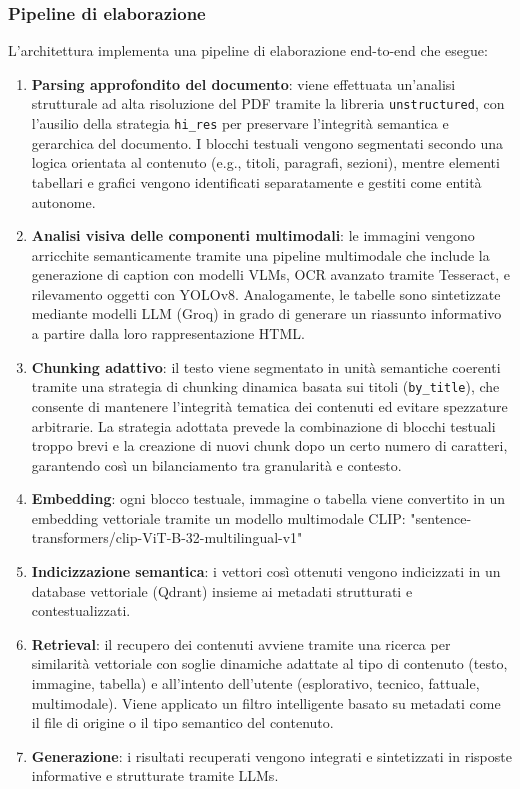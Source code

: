 \documentclass[12pt,a4paper]{article}
\begin{document}
\subsubsection{Pipeline di elaborazione}
L'architettura implementa una pipeline di elaborazione end-to-end che esegue:

\begin{enumerate}
    \item \textbf{Parsing approfondito del documento}: viene effettuata un'analisi strutturale ad alta risoluzione del PDF tramite la libreria \verb|unstructured|, con l'ausilio della strategia \verb|hi_res| per preservare l'integrità semantica e gerarchica del documento. I blocchi testuali vengono segmentati secondo una logica orientata al contenuto (e.g., titoli, paragrafi, sezioni), mentre elementi tabellari e grafici vengono identificati separatamente e gestiti come entità autonome.
    
    \item \textbf{Analisi visiva delle componenti multimodali}: le immagini vengono arricchite semanticamente tramite una pipeline multimodale che include la generazione di caption con modelli VLMs, OCR avanzato tramite Tesseract, e rilevamento oggetti con YOLOv8. Analogamente, le tabelle sono sintetizzate mediante modelli LLM (Groq) in grado di generare un riassunto informativo a partire dalla loro rappresentazione HTML.
    
    \item \textbf{Chunking adattivo}: il testo viene segmentato in unità semantiche coerenti tramite una strategia di chunking dinamica basata sui titoli (\verb|by_title|), che consente di mantenere l'integrità tematica dei contenuti ed evitare spezzature arbitrarie. La strategia adottata prevede la combinazione di blocchi testuali troppo brevi e la creazione di nuovi chunk dopo un certo numero di caratteri, garantendo così un bilanciamento tra granularità e contesto.
    
    \item \textbf{Embedding}: ogni blocco testuale, immagine o tabella viene convertito in un embedding vettoriale tramite un modello multimodale CLIP: "sentence-transformers/clip-ViT-B-32-multilingual-v1"
    
    \item \textbf{Indicizzazione semantica}: i vettori così ottenuti vengono indicizzati in un database vettoriale (Qdrant) insieme ai metadati strutturati e contestualizzati.
    
    \item \textbf{Retrieval}: il recupero dei contenuti avviene tramite una ricerca per similarità vettoriale con soglie dinamiche adattate al tipo di contenuto (testo, immagine, tabella) e all'intento dell'utente (esplorativo, tecnico, fattuale, multimodale). Viene applicato un filtro intelligente basato su metadati come il file di origine o il tipo semantico del contenuto.
    
    \item \textbf{Generazione}: i risultati recuperati vengono integrati e sintetizzati in risposte informative e strutturate tramite LLMs.
\end{enumerate}
\end{document}
